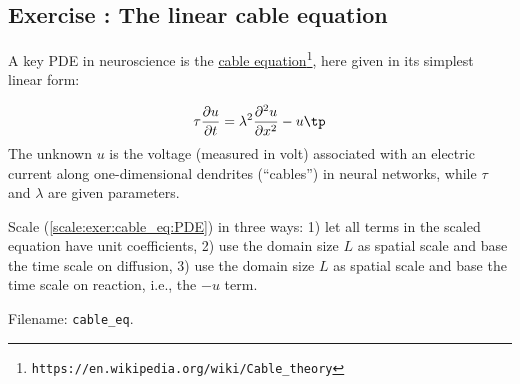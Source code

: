 \documentclass[graybox,envcountchap,sectrefs,final]{svmonodo}
\newcounter{doconce:movie:counter}
\newenvironment{doconceexercise}{}{}
\newcounter{doconceexercisecounter}
\begin{document}
\begin{doconceexercise}

\subsection*{Exercise \thedoconceexercisecounter: The linear cable equation}

\label{scale:exer:cable_eq}

A key PDE in neuroscience is the \href{{https://en.wikipedia.org/wiki/Cable_theory}}{cable equation}\footnote{\texttt{https://en.wikipedia.org/wiki/Cable\_theory}}, here given in its simplest linear form:

\begin{equation}
\tau\frac{\partial u}{\partial t} = \lambda^2\frac{\partial^2 u}{\partial x^2}
-u\tp
\label{scale:exer:cable_eq:PDE}
\end{equation}
The unknown $u$ is the voltage (measured in volt) associated with
an electric current along one-dimensional dendrites (``cables'')
in neural networks, while $\tau$ and $\lambda$ are given parameters.

Scale (\ref{scale:exer:cable_eq:PDE}) in three ways: 1) let all terms in
the scaled equation have unit coefficients, 2) use the domain size
$L$ as spatial scale and base the time scale on diffusion, 3) use the
domain size $L$ as spatial scale and base the time scale on
reaction, i.e., the $-u$ term.


\noindent Filename: \Verb!cable_eq!.

\end{doconceexercise}
\end{document}
